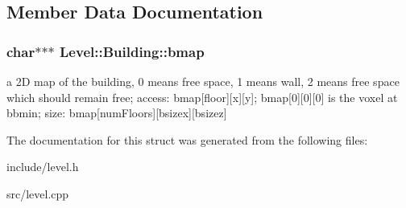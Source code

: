 \subsection{\-Member \-Data \-Documentation}
\hypertarget{structLevel_1_1Building_a684eaeadb756c94a6d81f1b6c3f27e84}{
\subsubsection[{bmap}]{\setlength{\rightskip}{0pt plus 5cm}char$\ast$$\ast$$\ast$ {\bf \-Level\-::\-Building\-::bmap}}}
\label{db/da2/structLevel_1_1Building_a684eaeadb756c94a6d81f1b6c3f27e84}
a 2\-D map of the building, 0 means free space, 1 means wall, 2 means free space which should remain free; access\-: bmap\mbox{[}floor\mbox{]}\mbox{[}x\mbox{]}\mbox{[}y\mbox{]}; bmap\mbox{[}0\mbox{]}\mbox{[}0\mbox{]}\mbox{[}0\mbox{]} is the voxel at bbmin; size\-: bmap\mbox{[}num\-Floors\mbox{]}\mbox{[}bsizex\mbox{]}\mbox{[}bsizez\mbox{]} 

\-The documentation for this struct was generated from the following files\-:\begin{DoxyCompactItemize}
\item 
include/level.\-h\item 
src/level.\-cpp\end{DoxyCompactItemize}
